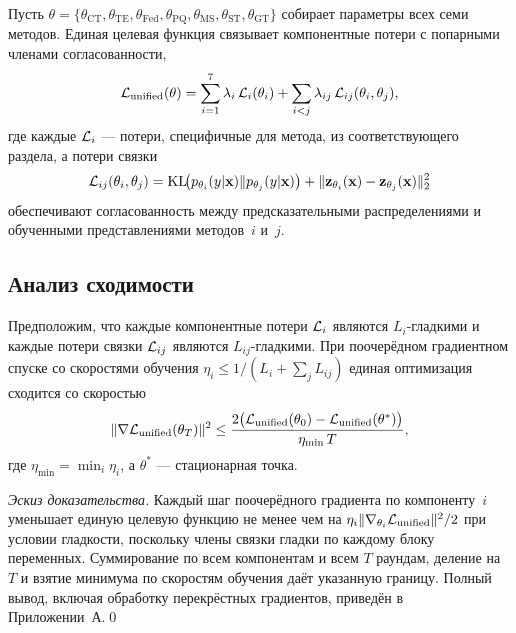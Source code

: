 Пусть $\theta=\{\theta_{\mathrm{CT}},\theta_{\mathrm{TE}},\theta_{\mathrm{Fed}},\theta_{\mathrm{PQ}},\theta_{\mathrm{MS}},\theta_{\mathrm{ST}},\theta_{\mathrm{GT}}\}$ собирает параметры всех семи методов. Единая целевая функция связывает компонентные потери с попарными членами согласованности,
\begin{equation}
\mathcal{L}_{\mathrm{unified}}(\theta)
= \sum_{i=1}^{7}\lambda_i\,\mathcal{L}_i(\theta_i)
+ \sum_{i<j}\lambda_{ij}\,\mathcal{L}_{ij}(\theta_i,\theta_j),
\label{eq:unified_obj}
\end{equation}
где каждые $\mathcal{L}_i$ --- потери, специфичные для метода, из соответствующего раздела, а потери связки
\begin{equation}
\mathcal{L}_{ij}(\theta_i,\theta_j)
= \mathrm{KL}\!\bigl(p_{\theta_i}(y|\mathbf{x})\|p_{\theta_j}(y|\mathbf{x})\bigr)
+ \|\mathbf{z}_{\theta_i}(\mathbf{x})-\mathbf{z}_{\theta_j}(\mathbf{x})\|_2^2
\label{eq:unified_coupling}
\end{equation}
обеспечивают согласованность между предсказательными распределениями и обученными представлениями методов~$i$ и~$j$.

\subsection{Анализ сходимости}

\begin{theorem}
\label{thm:unified}
Предположим, что каждые компонентные потери $\mathcal{L}_i$ являются $L_i$-гладкими и каждые потери связки $\mathcal{L}_{ij}$ являются $L_{ij}$-гладкими. При поочерёдном градиентном спуске со скоростями обучения $\eta_i\le 1/(L_i+\sum_j L_{ij})$ единая оптимизация сходится со скоростью
\begin{equation}
\|\nabla\mathcal{L}_{\mathrm{unified}}(\theta_T)\|^2
\le \frac{2\bigl(\mathcal{L}_{\mathrm{unified}}(\theta_0)
  -\mathcal{L}_{\mathrm{unified}}(\theta^*)\bigr)}{\eta_{\min}\,T},
\label{eq:unified_conv}
\end{equation}
где $\eta_{\min}=\min_i\eta_i$, а $\theta^*$ --- стационарная точка.
\end{theorem}

\noindent\textit{Эскиз доказательства.} Каждый шаг поочерёдного градиента по компоненту~$i$ уменьшает единую целевую функцию не менее чем на $\eta_i\|\nabla_{\theta_i}\mathcal{L}_{\mathrm{unified}}\|^2/2$ при условии гладкости, поскольку члены связки гладки по каждому блоку переменных. Суммирование по всем компонентам и всем $T$ раундам, деление на $T$ и взятие минимума по скоростям обучения даёт указанную границу. Полный вывод, включая обработку перекрёстных градиентов, приведён в Приложении~А.\qed

